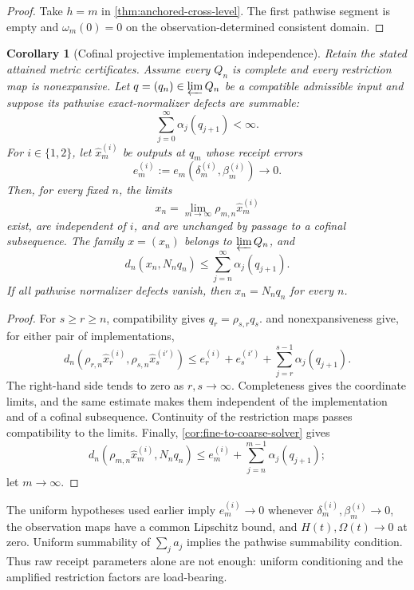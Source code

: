 \documentclass[11pt]{article}
\newtheorem{corollary}[theorem]{Corollary}
\theoremstyle{definition}
\theoremstyle{remark}
\numberwithin{equation}{section}
\begin{document}
\begin{proof}
Take $h=m$ in \cref{thm:anchored-cross-level}.  The first pathwise segment
is empty and $\omega_m(0)=0$ on the observation-determined consistent
domain.
\end{proof}

\begin{corollary}[Cofinal projective implementation independence]
\label{cor:cofinal-projective}
Retain the stated attained metric certificates. Assume every $Q_n$ is complete and every restriction map is nonexpansive.
Let $q=(q_n)\in\varprojlim Q_n$ be a compatible admissible input and suppose
its pathwise exact-normalizer defects are summable:
\[
 \sum_{j=0}^{\infty}\alpha_j(q_{j+1})<\infty.
\]
For $i\in\{1,2\}$, let $\widehat x_m^{(i)}$ be outputs at $q_m$ whose
receipt errors
\[
 e_m^{(i)}
 :=
 e_m(\delta_m^{(i)},\beta_m^{(i)})
 \longrightarrow0.
\]
Then, for every fixed $n$, the limits
\[
 x_n
 =
 \lim_{m\to\infty}\rho_{m,n}\widehat x_m^{(i)}
\]
exist, are independent of $i$, and are unchanged by passage to a cofinal
subsequence.  The family $x=(x_n)$ belongs to $\varprojlim Q_n$, and
\[
 d_n(x_n,N_nq_n)
 \le
 \sum_{j=n}^{\infty}\alpha_j(q_{j+1}).
\]
If all pathwise normalizer defects vanish, then $x_n=N_nq_n$ for every $n$.
\end{corollary}

\begin{proof}
For $s\ge r\ge n$, compatibility gives $q_r=\rho_{s,r}q_s$.
 and nonexpansiveness give, for either pair of
implementations,
\[
 d_n\!\left(
 \rho_{r,n}\widehat x_r^{(i)},
 \rho_{s,n}\widehat x_s^{(i')}
 \right)
 \le
 e_r^{(i)}+e_s^{(i')}
 +\sum_{j=r}^{s-1}\alpha_j(q_{j+1}).
\]
The right-hand side tends to zero as $r,s\to\infty$.  Completeness gives
the coordinate limits, and the same estimate makes them independent of the
implementation and of a cofinal subsequence.  Continuity of the restriction
maps passes compatibility to the limits.  Finally,
\cref{cor:fine-to-coarse-solver} gives
\[
 d_n\!\left(
 \rho_{m,n}\widehat x_m^{(i)},N_nq_n
 \right)
 \le
 e_m^{(i)}
 +\sum_{j=n}^{m-1}\alpha_j(q_{j+1});
\]
let $m\to\infty$.
\end{proof}

The uniform hypotheses used earlier imply $e_m^{(i)}\to0$ whenever
$\delta_m^{(i)},\beta_m^{(i)}\to0$, the observation maps have a common
Lipschitz bound, and $H(t),\Omega(t)\to0$ at zero.  Uniform summability of
$\sum_j a_j$ implies the pathwise summability condition.  Thus raw receipt
parameters alone are not enough: uniform conditioning and the amplified
restriction factors are load-bearing.
\end{document}
